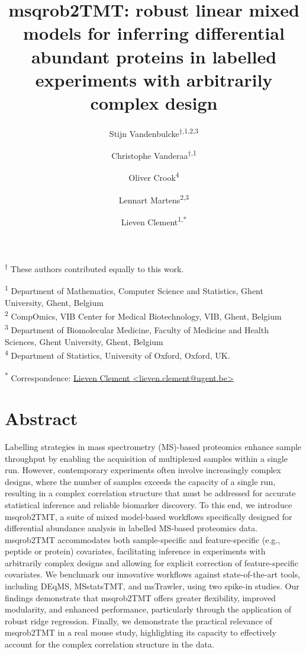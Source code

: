 \documentclass[
  letterpaper,
  DIV=11,
  numbers=noendperiod]{scrartcl}
\title{msqrob2TMT: robust linear mixed models for inferring differential
abundant proteins in labelled experiments with arbitrarily complex
design}
\author{Stijn
Vandenbulcke\textsuperscript{$\dagger{}$,1,2,3} \and Christophe
Vanderaa\textsuperscript{$\dagger{}$,1} \and Oliver
Crook\textsuperscript{4} \and Lennart
Martens\textsuperscript{2,3} \and Lieven Clement\textsuperscript{1,*}}
\date{}
\begin{document}
\maketitle


\textsuperscript{$\dagger{}$}
These authors contributed equally to this work.

\textsuperscript{1} Department of Mathematics, Computer Science and
Statistics, Ghent University, Ghent, Belgium\\
\textsuperscript{2} CompOmics, VIB Center for Medical Biotechnology,
VIB, Ghent, Belgium\\
\textsuperscript{3} Department of Biomolecular Medicine, Faculty of
Medicine and Health Sciences, Ghent University, Ghent, Belgium\\
\textsuperscript{4} Department of Statistics, University of Oxford,
Oxford, UK.

\textsuperscript{*} Correspondence:
\href{mailto:lieven.clement@ugent.be}{Lieven Clement
\textless{}lieven.clement@ugent.be\textgreater{}}

\captionsetup{labelfont=bf}
\setcapindent{0pt}

\section*{Abstract}

Labelling strategies in mass spectrometry (MS)-based proteomics enhance
sample throughput by enabling the acquisition of multiplexed samples
within a single run. However, contemporary experiments often involve
increasingly complex designs, where the number of samples exceeds the
capacity of a single run, resulting in a complex correlation structure
that must be addressed for accurate statistical inference and reliable
biomarker discovery. To this end, we introduce msqrob2TMT, a suite of
mixed model-based workflows specifically designed for differential
abundance analysis in labelled MS-based proteomics data. msqrob2TMT
accommodates both sample-specific and feature-specific (e.g., peptide or
protein) covariates, facilitating inference in experiments with
arbitrarily complex designs and allowing for explicit correction of
feature-specific covariates. We benchmark our innovative workflows
against state-of-the-art tools, including DEqMS, MSstatsTMT, and
msTrawler, using two spike-in studies. Our findings demonstrate that
msqrob2TMT offers greater flexibility, improved modularity, and enhanced
performance, particularly through the application of robust ridge
regression. Finally, we demonstrate the practical relevance of
msqrob2TMT in a real mouse study, highlighting its capacity to
effectively account for the complex correlation structure in the data.
\end{document}
